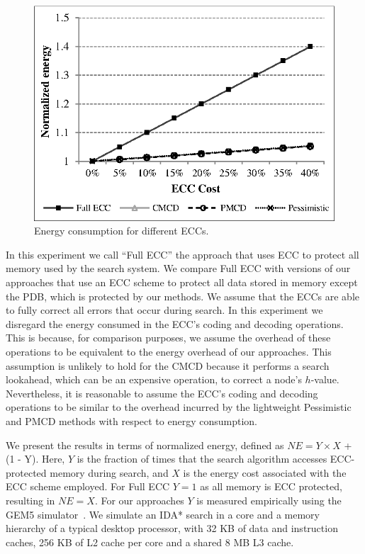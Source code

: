 \documentclass[letterpaper]{article}
\begin{document}
\begin{figure}[!htb]
\centering
\includegraphics[scale=.9]{figures/ecc_chart.eps}
\caption{Energy consumption for different ECCs.}
\label{fig:ecc}
\end{figure}

In this experiment we call ``Full ECC'' the approach that uses ECC to protect all memory used by the search system. We compare Full ECC with versions of our approaches that use an ECC scheme to protect all data stored in memory except the PDB, which is protected by our methods. We assume that the ECCs are able to fully correct all errors that occur during search. In this experiment we disregard the energy consumed in the ECC's coding and decoding operations. This is because, for comparison purposes, we assume the overhead of these operations to be equivalent to the energy
overhead of our approaches. This assumption is unlikely to hold for the CMCD because it performs a search lookahead, which can be an expensive operation, to correct a node's $h$-value. Nevertheless, it is reasonable to assume the ECC's coding and decoding operations to be similar to the overhead incurred by the lightweight Pessimistic and PMCD methods with respect to energy consumption.


We present the results in terms of normalized energy, defined as $NE = Y \times X$ + (1 - Y). Here, $Y$ is the fraction of times that the search algorithm accesses ECC-protected memory during search, and $X$ is the energy cost associated with the ECC scheme employed. For Full ECC $Y = 1$ as all memory is ECC protected, resulting in $NE = X$. For our approaches $Y$ is measured empirically using the GEM5 simulator~\cite{Binkert2011}. We simulate an IDA* search in a core and a memory hierarchy of a typical desktop processor, with 32 KB of data and instruction caches, 256 KB of L2 cache per core and a shared 8 MB L3 cache.
\end{document}
